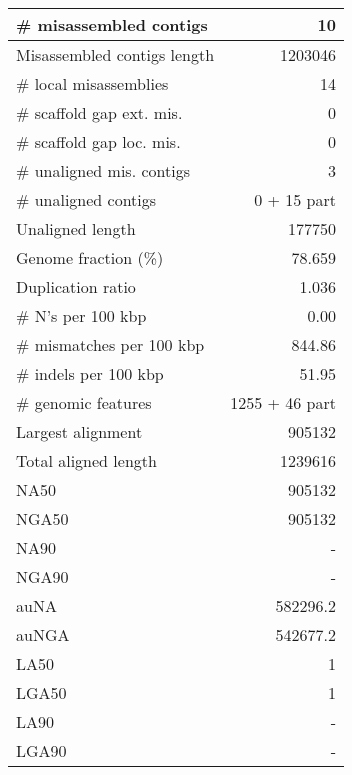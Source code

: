 \documentclass[12pt,a4paper]{article}
\begin{document}
\begin{table}[ht]
\begin{center}
\begin{tabular}{|l*{1}{|r}|}
\# misassembled contigs & 10 \\ \hline
Misassembled contigs length & 1203046 \\ \hline
\# local misassemblies & 14 \\ \hline
\# scaffold gap ext. mis. & 0 \\ \hline
\# scaffold gap loc. mis. & 0 \\ \hline
\# unaligned mis. contigs & 3 \\ \hline
\# unaligned contigs & 0 + 15 part \\ \hline
Unaligned length & 177750 \\ \hline
Genome fraction (\%) & 78.659 \\ \hline
Duplication ratio & 1.036 \\ \hline
\# N's per 100 kbp & 0.00 \\ \hline
\# mismatches per 100 kbp & 844.86 \\ \hline
\# indels per 100 kbp & 51.95 \\ \hline
\# genomic features & 1255 + 46 part \\ \hline
Largest alignment & 905132 \\ \hline
Total aligned length & 1239616 \\ \hline
NA50 & 905132 \\ \hline
NGA50 & 905132 \\ \hline
NA90 & - \\ \hline
NGA90 & - \\ \hline
auNA & 582296.2 \\ \hline
auNGA & 542677.2 \\ \hline
LA50 & 1 \\ \hline
LGA50 & 1 \\ \hline
LA90 & - \\ \hline
LGA90 & - \\ \hline
\end{tabular}
\end{center}
\end{table}
\end{document}
